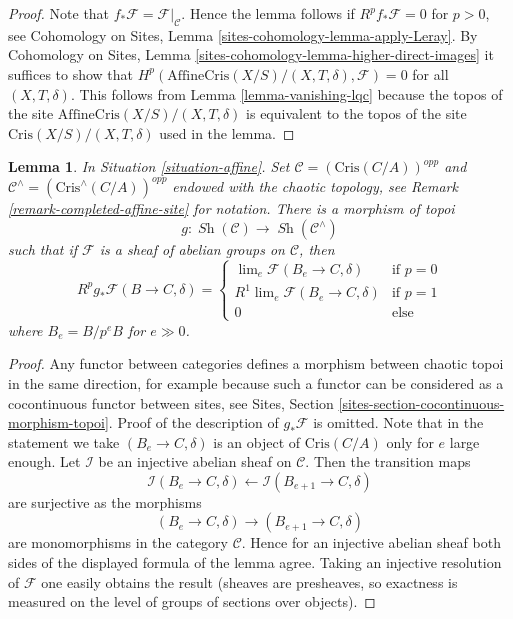 \documentclass{stacks-project}
\theoremstyle{plain}
\newtheorem{lemma}[subsection]{Lemma}
\theoremstyle{definition}
\theoremstyle{remark}
\numberwithin{equation}{subsection}
\def\lim{\mathop{\mathrm{lim}}\nolimits}
\def\Sh{\mathop{\mathit{Sh}}\nolimits}
\begin{document}
\begin{proof}
\medskip\noindent
Note that $f_*\mathcal{F} = \mathcal{F}|_\mathcal{C}$. Hence the lemma
follows if $R^pf_*\mathcal{F} = 0$ for $p > 0$, see
Cohomology on Sites, Lemma \ref{sites-cohomology-lemma-apply-Leray}. By
Cohomology on Sites, Lemma \ref{sites-cohomology-lemma-higher-direct-images}
it suffices to show that
$H^p(\text{AffineCris}(X/S)/(X, T, \delta), \mathcal{F}) = 0$
for all $(X, T, \delta)$.
This follows from Lemma \ref{lemma-vanishing-lqc} because the
topos of the site $\text{AffineCris}(X/S)/(X, T, \delta)$
is equivalent to the topos of the site
$\text{Cris}(X/S)/(X, T, \delta)$ used in the lemma.
\end{proof}

\begin{lemma}
\label{lemma-complete}
In Situation \ref{situation-affine}.
Set $\mathcal{C} = (\text{Cris}(C/A))^{opp}$ and
$\mathcal{C}^\wedge = (\text{Cris}^\wedge(C/A))^{opp}$
endowed with the chaotic topology, see
Remark \ref{remark-completed-affine-site} for notation.
There is a morphism of topoi
$$
g : \Sh(\mathcal{C}) \longrightarrow \Sh(\mathcal{C}^\wedge)
$$
such that if $\mathcal{F}$ is a sheaf of abelian groups on
$\mathcal{C}$, then
$$
R^pg_*\mathcal{F}(B \to C, \delta) =
\left\{
\begin{matrix}
\lim_e \mathcal{F}(B_e \to C, \delta) & \text{if }p = 0 \\
R^1\lim_e \mathcal{F}(B_e \to C, \delta) & \text{if }p = 1 \\
0 & \text{else}
\end{matrix}
\right.
$$
where $B_e = B/p^eB$ for $e \gg 0$.
\end{lemma}

\begin{proof}
Any functor between categories defines a morphism between chaotic
topoi in the same direction, for example because such a functor
can be considered as a cocontinuous functor between sites, see
Sites, Section \ref{sites-section-cocontinuous-morphism-topoi}.
Proof of the description of $g_*\mathcal{F}$ is omitted.
Note that in the statement we take $(B_e \to C, \delta)$
is an object of $\text{Cris}(C/A)$  only for $e$ large enough.
Let $\mathcal{I}$ be an injective abelian sheaf on $\mathcal{C}$.
Then the transition maps
$$
\mathcal{I}(B_e \to C, \delta) \leftarrow
\mathcal{I}(B_{e + 1} \to C, \delta)
$$
are surjective as the morphisms
$$
(B_e \to C, \delta)
\longrightarrow
(B_{e + 1} \to C, \delta)
$$
are monomorphisms in the category $\mathcal{C}$. Hence for an injective
abelian sheaf both sides of the displayed formula of the lemma agree.
Taking an injective resolution of $\mathcal{F}$ one easily obtains
the result (sheaves are presheaves, so exactness is measured on the
level of groups of sections over objects).
\end{proof}
\end{document}
